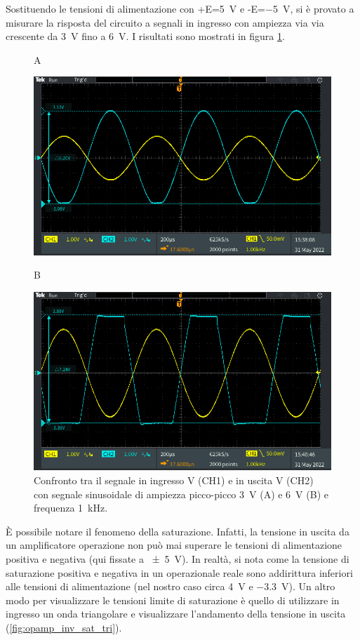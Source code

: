 \noindent
Sostituendo le tensioni di alimentazione con +E=\SI{+5}{\volt} e -E=\SI{-5}{\volt}, si è provato a misurare la risposta del circuito a segnali in ingresso con ampiezza via via crescente da \SI{3}{\volt} fino a \SI{6}{\volt}. I risultati sono mostrati in figura \ref{fig:opamp_inv_sat}.
\begin{figure}[h!]
	\centering
	A
	\vspace{0.5cm}
	
	\includegraphics[width=0.7\linewidth]{./ImageFiles/Laboratorio 4/TEK00008}
	
	B
	\vspace{0.5cm}
	
	\includegraphics[width=0.7\linewidth]{./ImageFiles/Laboratorio 4/TEK00012}
	\caption{Confronto tra il segnale in ingresso V (CH1)  e in uscita V (CH2) con segnale sinusoidale di ampiezza picco-picco \SI{3}{\volt} (A) e \SI{6}{\volt} (B) e frequenza \SI{1}{\kilo\hertz}.}
	\label{fig:opamp_inv_sat}
\end{figure}
\`E possibile notare il fenomeno della saturazione. Infatti, la tensione in uscita da un amplificatore operazione non può mai superare le tensioni di alimentazione positiva e negativa (qui fissate a \SI{+-5}{\volt}). In realtà, si nota come la tensione di saturazione positiva e negativa in un operazionale reale sono addirittura inferiori alle tensioni di alimentazione (nel nostro caso circa \SI{4}{\volt} e \SI{-3.3}{\volt}). Un altro modo per visualizzare le tensioni limite di saturazione è quello di utilizzare in ingresso un onda triangolare e visualizzare l'andamento della tensione in uscita (\Fig\ref{fig:opamp_inv_sat_tri}).
